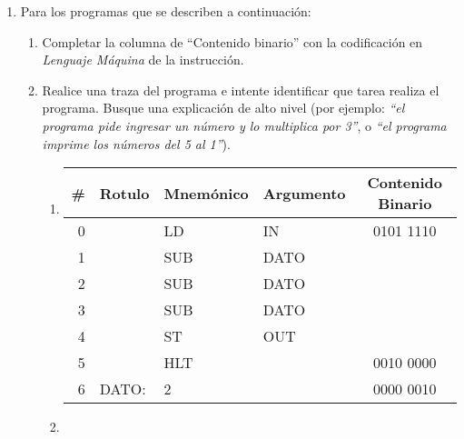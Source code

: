 \documentclass[12pt]{article}
\begin{document}
\begin{enumerate}

    \item Para los programas que se describen a continuación:

        \begin{enumerate}

            \item Completar la columna de ``Contenido binario'' con la
                codificación en \emph{Lenguaje Máquina} de la instrucción.

            \item Realice una traza del programa e intente identificar que
                tarea realiza el programa. Busque una explicación de alto
                nivel (por ejemplo: \emph{``el programa pide ingresar un número y lo
                multiplica por 3''}, o \emph{``el programa imprime los números del 5
                al 1''}).

            \begin{enumerate}
            \itemsep2em \parskip0pt 

                \item \begin{tabular}{|r||l|l|l||c|}

                    \hline

                    \textbf{\#} & \textbf{Rotulo} & \textbf{Mnemónico} &
                    \textbf{Argumento} & \textbf{Contenido Binario}\\
                    \hline
                    \hline

                    0 & & LD & IN & 0101 1110\\ \hline
                    1 & & SUB & DATO & \\ \hline
                    2 & & SUB & DATO & \\ \hline
                    3 & & SUB & DATO & \\ \hline
                    4 & & ST & OUT & \\ \hline
                    5 & & HLT & & 0010 0000\\ \hline
                    6 & DATO: & 2 & & 0000 0010\\ \hline

                \end{tabular}

                \item \begin{tabular}{|r||l|l|l||c|}


\end{tabular}
\end{enumerate}
\end{enumerate}
\end{enumerate}
\end{document}
